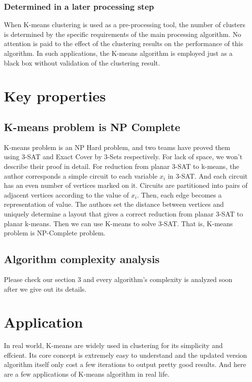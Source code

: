 \documentclass[11pt]{article}
\begin{document}
\subsubsection{Determined in a later processing step}
When K-means clustering is used as a pre-processing tool, the number of clusters is determined by the specific requirements of the main processing algorithm. No attention is paid to the effect of the clustering results on the performance of this algorithm. In such applications, the K-means algorithm is employed just as a black box without validation of the clustering result. \par

\section{Key properties}
\subsection{K-means problem is NP Complete}
K-means problem is an NP Hard problem, and two teams have proved them using 3-SAT and Exact Cover by 3-Sets respectively.\cite{npc-prove,Vattani_thehardness}  For lack of space, we won't describe their proof in detail. For reduction from planar 3-SAT to k-means, the author corresponds a simple circuit to each variable $x_i$ in 3-SAT. And each circuit has an even number of vertices marked on it. Circuits are partitioned into pairs of adjacent vertices according to the value of $x_i$. Then, each edge becomes a representation of value. The authors set the distance between vertices and uniquely determine a layout that gives a correct reduction from planar 3-SAT to planar k-means. Then we can use K-means to solve 3-SAT. That is, K-means problem is NP-Complete problem.
\subsection{Algorithm complexity analysis}
Please check our section 3 and every algorithm's complexity is analyzed soon after we give out its details.

\section{Application}
In real world, K-means are widely used in clustering for its simplicity and effcient. Its core concept is extremely easy to understand and the updated version algorithm itself only cost a few iterations to output pretty good results. And here are a few applications of K-means algorithm in real life.
\end{document}
